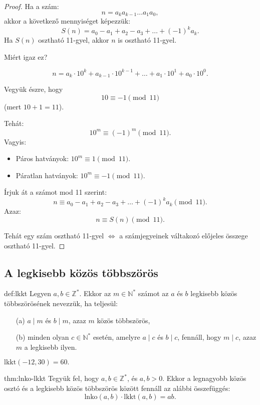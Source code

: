 \begin{proof}
Ha a szám: 
\[
n=a_{k}a_{k-1}\dots a_{1}a_{0},
\]
akkor a következő mennyiséget képezzük: 
\[
S(n)=a_{0}-a_{1}+a_{2}-a_{3}+\dots+(-1)^{k}a_{k}.
\]
Ha $S(n)$ osztható 11-gyel, akkor $n$ is osztható 11-gyel.

Miért igaz ez?

\[
n=a_{k}\cdot10^{k}+a_{k-1}\cdot10^{k-1}+\dots+a_{1}\cdot10^{1}+a_{0}\cdot10^{0}.
\]

Vegyük észre, hogy 
\[
10\equiv-1\pmod{11}
\]
(mert $10+1=11$).

Tehát: 
\[
10^{m}\equiv(-1)^{m}\pmod{11}.
\]
Vagyis:
\begin{itemize}
\item Páros hatványok: $10^{m}\equiv1\pmod{11}$.
\item Páratlan hatványok: $10^{m}\equiv-1\pmod{11}$.
\end{itemize}
Írjuk át a számot mod 11 szerint: 
\[
n\equiv a_{0}-a_{1}+a_{2}-a_{3}+\dots+(-1)^{k}a_{k}\pmod{11}.
\]
Azaz: 
\[
n\equiv S(n)\pmod{11}.
\]

Tehát egy szám osztható 11-gyel $\iff$ a számjegyeinek váltakozó
előjeles összege osztható 11-gyel.
\end{proof}

\subsection*{A legkisebb közös többszörös}
\begin{definition}{def:lkkt}
Legyen $a,b\in\mathbb{Z}^{*}$. Ekkor az $m\in\mathbb{N}^{*}$ számot
az $a$ és $b$ legkisebb közös többszörösének nevezzük, ha teljesül:
\begin{itemize}
\item[(a)] $a\mid m$ és $b\mid m$, azaz $m$ közös többszörös,
\item[(b)] minden olyan $c\in\mathbb{N}^{*}$ esetén, amelyre $a\mid c$ és
$b\mid c$, fennáll, hogy $m\mid c$, azaz $m$ a legkisebb ilyen.
\end{itemize}
\end{definition}

\begin{example}
$\mathrm{lkkt}(-12,30)=60.$
\end{example}

\begin{theorem}{thm:lnko-lkkt}
Tegyük fel, hogy $a,b\in\mathbb{Z}^{*}$, és $a,b>0$. Ekkor a legnagyobb
közös osztó és a legkisebb közös többszörös között fennáll az alábbi
összefüggés: 
\[
\mathrm{lnko}(a,b)\cdot\mathrm{lkkt}(a,b)=ab.
\]
\end{theorem}

